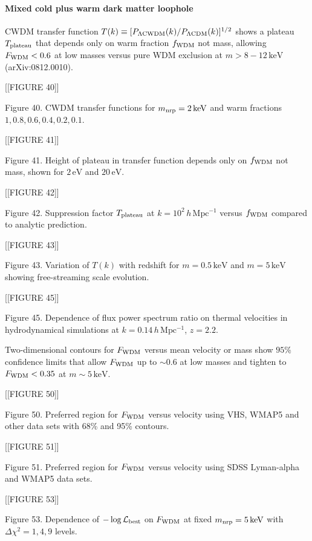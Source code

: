 \documentclass[11pt,a4paper]{article}
\begin{document}
\paragraph{Mixed cold plus warm dark matter loophole}
CWDM transfer function $T(k) \equiv [P_{\Lambda{\rm CWDM}}(k)/P_{\Lambda{\rm CDM}}(k)]^{1/2}$ shows a plateau $T_{\rm plateau}$ that depends only on warm fraction $f_{\rm WDM}$ not mass, allowing $F_{\rm WDM} < 0.6$ at low masses versus pure WDM exclusion at $m > 8-12\,\mathrm{keV}$ (arXiv:0812.0010).


[[FIGURE 40]]

Figure 40. CWDM transfer functions for $m_{\rm nrp}=2\,\mathrm{keV}$ and warm fractions $1,0.8,0.6,0.4,0.2,0.1$.


[[FIGURE 41]]

Figure 41. Height of plateau in transfer function depends only on $f_{\rm WDM}$ not mass, shown for $2\,\mathrm{eV}$ and $20\,\mathrm{eV}$.


[[FIGURE 42]]

Figure 42. Suppression factor $T_{\rm plateau}$ at $k=10^2\,h\,\mathrm{Mpc^{-1}}$ versus $f_{\rm WDM}$ compared to analytic prediction.


[[FIGURE 43]]

Figure 43. Variation of $T(k)$ with redshift for $m=0.5\,\mathrm{keV}$ and $m=5\,\mathrm{keV}$ showing free-streaming scale evolution.


[[FIGURE 45]]

Figure 45. Dependence of flux power spectrum ratio on thermal velocities in hydrodynamical simulations at $k=0.14\,h\,\mathrm{Mpc^{-1}}$, $z=2.2$.

Two-dimensional contours for $F_{\rm WDM}$ versus mean velocity or mass show $95\%$ confidence limits that allow $F_{\rm WDM}$ up to $\sim 0.6$ at low masses and tighten to $F_{\rm WDM} < 0.35$ at $m \sim 5\,\mathrm{keV}$.


[[FIGURE 50]]

Figure 50. Preferred region for $F_{\rm WDM}$ versus velocity using VHS, WMAP5 and other data sets with 68\% and 95\% contours.


[[FIGURE 51]]

Figure 51. Preferred region for $F_{\rm WDM}$ versus velocity using SDSS Lyman-alpha and WMAP5 data sets.


[[FIGURE 53]]

Figure 53. Dependence of $-\log\mathcal{L}_{\rm best}$ on $F_{\rm WDM}$ at fixed $m_{\rm nrp}=5\,\mathrm{keV}$ with $\Delta\chi^2=1,4,9$ levels.
\end{document}
